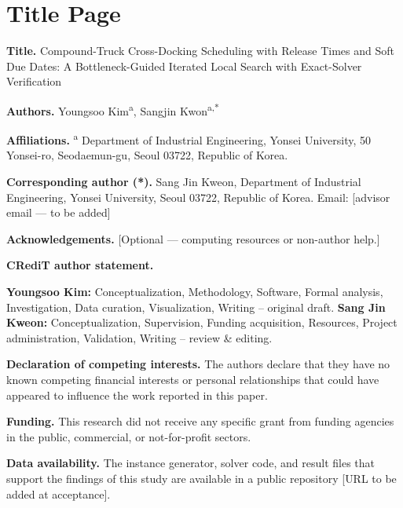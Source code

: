 \documentclass{article}
\begin{document}
\section*{Title Page}

\textbf{Title.} Compound-Truck Cross-Docking Scheduling with Release
Times and Soft Due Dates: A Bottleneck-Guided Iterated Local Search with
Exact-Solver Verification

\textbf{Authors.} Youngsoo Kim\textsuperscript{a}, Sangjin
Kwon\textsuperscript{a,*}

\textbf{Affiliations.} \textsuperscript{a} Department of Industrial Engineering, Yonsei University, 50 Yonsei-ro, Seodaemun-gu, Seoul 03722,
Republic of Korea.

\textbf{Corresponding author (*).} Sang Jin Kweon, Department of Industrial Engineering, Yonsei University, Seoul 03722, Republic of Korea. Email:
{[}advisor email --- to be added{]}

\textbf{Acknowledgements.} {[}Optional --- computing resources or
non-author help.{]}

\textbf{CRediT author statement.}

\textbf{Youngsoo Kim:} Conceptualization, Methodology, Software, Formal
analysis, Investigation, Data curation, Visualization, Writing -- original
draft. \textbf{Sang Jin Kweon:} Conceptualization, Supervision, Funding
acquisition, Resources, Project administration, Validation, Writing --
review \& editing.

\textbf{Declaration of competing interests.} The authors declare that they
have no known competing financial interests or personal relationships that
could have appeared to influence the work reported in this paper.

\textbf{Funding.} This research did not receive any specific grant from
funding agencies in the public, commercial, or not-for-profit sectors.

\textbf{Data availability.} The instance generator, solver code, and result
files that support the findings of this study are available in a public
repository {[}URL to be added at acceptance{]}.
\end{document}
